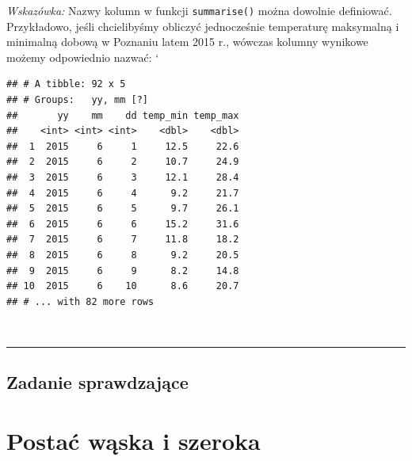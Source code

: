 \documentclass[]{book}
\newenvironment{Shaded}{\begin{snugshade}}{\end{snugshade}}
\newcommand{\KeywordTok}[1]{\textcolor[rgb]{0.13,0.29,0.53}{\textbf{#1}}}
\newcommand{\DataTypeTok}[1]{\textcolor[rgb]{0.13,0.29,0.53}{#1}}
\newcommand{\DecValTok}[1]{\textcolor[rgb]{0.00,0.00,0.81}{#1}}
\newcommand{\StringTok}[1]{\textcolor[rgb]{0.31,0.60,0.02}{#1}}
\newcommand{\OperatorTok}[1]{\textcolor[rgb]{0.81,0.36,0.00}{\textbf{#1}}}
\newcommand{\NormalTok}[1]{#1}
\theoremstyle{definition}
\theoremstyle{definition}
\theoremstyle{definition}
\theoremstyle{remark}
\begin{document}
\emph{Wskazówka:} Nazwy kolumn w funkcji \texttt{summarise()} można
dowolnie definiować. Przykładowo, jeśli chcielibyśmy obliczyć
jednocześnie temperaturę maksymalną i minimalną dobową w Poznaniu latem
2015 r., wówczas kolumny wynikowe możemy odpowiednio nazwać: `

\begin{Shaded}
\end{Shaded}

\begin{verbatim}
## # A tibble: 92 x 5
## # Groups:   yy, mm [?]
##       yy    mm    dd temp_min temp_max
##    <int> <int> <int>    <dbl>    <dbl>
##  1  2015     6     1     12.5     22.6
##  2  2015     6     2     10.7     24.9
##  3  2015     6     3     12.1     28.4
##  4  2015     6     4      9.2     21.7
##  5  2015     6     5      9.7     26.1
##  6  2015     6     6     15.2     31.6
##  7  2015     6     7     11.8     18.2
##  8  2015     6     8      9.2     20.5
##  9  2015     6     9      8.2     14.8
## 10  2015     6    10      8.6     20.7
## # ... with 82 more rows
\end{verbatim}

~

\begin{center}\rule{0.5\linewidth}{\linethickness}\end{center}

\section*{Zadanie sprawdzające}\label{zadanie-sprawdzajace-3}

\chapter{Postać wąska i szeroka}\label{postac-waska-i-szeroka}
\end{document}
